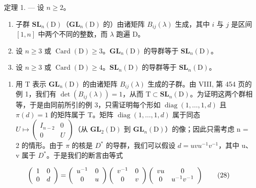 定理 1. --- 设 \(n \geqslant 2\)。

\begin{enumerate}
\def\labelenumi{\alph{enumi})}
\item
  子群 \(\mathbf{SL}_n(\mathrm{D})\)（\(\mathbf{GL}_n(\mathrm{D})\) 的）由诸矩阵 \(B_{ij}(\lambda)\) 生成，其中 \(i\) 与 \(j\) 是区间 \([1,n]\) 中两个不同的整数，而 \(\lambda\) 跑遍 D。
\item
  设 \(n \geqslant 3\) 或 \(\operatorname{Card}(\mathrm{D}) \geqslant 3\)。\(\mathbf{GL}_n(\mathrm{D})\) 的导群等于 \(\mathbf{SL}_n(\mathrm{D})\)。
\item
  设 \(n \geqslant 3\) 或 \(\operatorname{Card}(\mathrm{D}) \geqslant 4\)。\(\mathbf{SL}_n(\mathrm{D})\) 的导群等于 \(\mathbf{SL}_n(\mathrm{D})\)。
\end{enumerate}

\begin{enumerate}
\def\labelenumi{\Alph{enumi})}
\tightlist
\item
  用 T 表示 \(\mathbf{GL}_{n}(\mathrm{D})\) 的由诸矩阵 \(B_{ij}(\lambda)\) 生成的子群。由 VIII, 第 454 页的例 1，我们有 \(\det(B_{ij}(\lambda)) = 1\)，从而 \(\mathrm{T} \subset \mathbf{SL}_{n}(\mathrm{D})\)。为证明这两个群相等，于是由同前所引的例 3，只需证明每个形如 \(\operatorname{diag}(1, \ldots, 1, d)\) 且 \(\pi(d) = 1\) 的矩阵属于 T。矩阵 \(\operatorname{diag}(1, \ldots, 1, d)\) 属于同态 \(U \mapsto \begin{pmatrix} I_{n-2} & 0 \\ 0 & U \end{pmatrix}\)（从 \(\mathbf{GL}_{2}(\mathrm{D})\) 到 \(\mathbf{GL}_{n}(\mathrm{D})\)）的像；因此只需考虑 n = 2 的情形。由于 \(\pi\) 的核是 \(D^{*}\) 的导群，我们可以假设 \(d = uvu^{-1}v^{-1}\)，其中 u、v 属于 \(D^{*}\)。于是我们的断言由等式
\end{enumerate}

\[
\left( \begin{array}{c c} 1 & 0 \\ 0 & d \end{array} \right) = \left( \begin{array}{c c} u ^ {- 1} & 0 \\ 0 & u \end{array} \right) \left( \begin{array}{c c} v ^ {- 1} & 0 \\ 0 & v \end{array} \right) \left( \begin{array}{c c} v u & 0 \\ 0 & u ^ {- 1} v ^ {- 1} \end{array} \right)\tag{28}
\]

